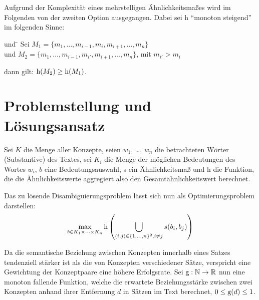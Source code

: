 Aufgrund der Komplexität eines mehrstelligen Ähnlichkeitsmaßes wird im Folgenden von der zweiten Option ausgegangen.
Dabei sei h "`monoton steigend"' im folgenden Sinne:
\begin{tabbing}
und \=\kill
Sei \>$M_1 = \{m_1,\ldots,m_{i-1},m_{i},m_{i+1},\ldots,m_n\}$\\
und \>$M_2 = \{m_1,\ldots,m_{i-1},m_{i'},m_{i+1},\ldots,m_n\}$, mit $m_{i'}>m_{i}$\\
\end{tabbing}
dann gilt: $\textnormal{h}(M_2) \geq \textnormal{h}(M_1)$.


\section{Problemstellung und Lösungsansatz}
Sei $K$ die Menge aller Konzepte, seien $w_1$, \ldots, $w_n$ die betrachteten Wörter (Substantive) des Textes, sei $K_i$ die Menge der möglichen Bedeutungen des Wortes $w_i$,
$b$ eine Bedeutungsauswahl, s ein Ähnlichkeitsmaß und h die Funktion, die die Ähnlichkeitswerte aggregiert also den Gesamtähnlichkeitswert berechnet.

Das zu lösende Disambiguierungsproblem lässt sich nun als Optimierungsproblem darstellen:
\begin{equation*}
\max_{b\in K_1\times\cdots\times K_n} \textnormal{h}\left(\bigcup_{(i,j) \in \{1,\ldots,n\}^2, i\neq j} s(b_i,b_j)\right)
\end{equation*}

Da die semantische Beziehung zwischen Konzepten innerhalb eines Satzes tendenziell stärker ist als die von Konzepten verschiedener Sätze,
verspricht eine Gewichtung der Konzeptpaare eine höhere Erfolgsrate.
Sei $\textnormal{g}: \mathbb{N} \rightarrow \mathbb{R}$ nun eine monoton fallende Funktion, welche die erwartete Beziehungsstärke zwischen zwei Konzepten anhand ihrer Entfernung $d$ in Sätzen im Text berechnet,
$0 \leq \textnormal{g}(d) \leq 1$.

